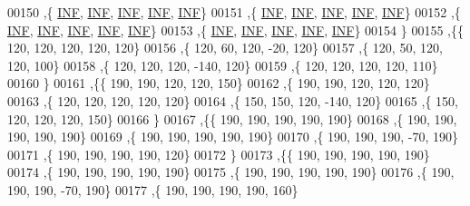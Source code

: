 \begin{DoxyCode}
00150   ,\{   \mbox{\hyperlink{1_88_84__epars_8h_a12c2040f25d8e3a7b9e1c2024c618cb6}{INF}},   \mbox{\hyperlink{1_88_84__epars_8h_a12c2040f25d8e3a7b9e1c2024c618cb6}{INF}},   \mbox{\hyperlink{1_88_84__epars_8h_a12c2040f25d8e3a7b9e1c2024c618cb6}{INF}},   \mbox{\hyperlink{1_88_84__epars_8h_a12c2040f25d8e3a7b9e1c2024c618cb6}{INF}},   \mbox{\hyperlink{1_88_84__epars_8h_a12c2040f25d8e3a7b9e1c2024c618cb6}{INF}}\}
00151   ,\{   \mbox{\hyperlink{1_88_84__epars_8h_a12c2040f25d8e3a7b9e1c2024c618cb6}{INF}},   \mbox{\hyperlink{1_88_84__epars_8h_a12c2040f25d8e3a7b9e1c2024c618cb6}{INF}},   \mbox{\hyperlink{1_88_84__epars_8h_a12c2040f25d8e3a7b9e1c2024c618cb6}{INF}},   \mbox{\hyperlink{1_88_84__epars_8h_a12c2040f25d8e3a7b9e1c2024c618cb6}{INF}},   \mbox{\hyperlink{1_88_84__epars_8h_a12c2040f25d8e3a7b9e1c2024c618cb6}{INF}}\}
00152   ,\{   \mbox{\hyperlink{1_88_84__epars_8h_a12c2040f25d8e3a7b9e1c2024c618cb6}{INF}},   \mbox{\hyperlink{1_88_84__epars_8h_a12c2040f25d8e3a7b9e1c2024c618cb6}{INF}},   \mbox{\hyperlink{1_88_84__epars_8h_a12c2040f25d8e3a7b9e1c2024c618cb6}{INF}},   \mbox{\hyperlink{1_88_84__epars_8h_a12c2040f25d8e3a7b9e1c2024c618cb6}{INF}},   \mbox{\hyperlink{1_88_84__epars_8h_a12c2040f25d8e3a7b9e1c2024c618cb6}{INF}}\}
00153   ,\{   \mbox{\hyperlink{1_88_84__epars_8h_a12c2040f25d8e3a7b9e1c2024c618cb6}{INF}},   \mbox{\hyperlink{1_88_84__epars_8h_a12c2040f25d8e3a7b9e1c2024c618cb6}{INF}},   \mbox{\hyperlink{1_88_84__epars_8h_a12c2040f25d8e3a7b9e1c2024c618cb6}{INF}},   \mbox{\hyperlink{1_88_84__epars_8h_a12c2040f25d8e3a7b9e1c2024c618cb6}{INF}},   \mbox{\hyperlink{1_88_84__epars_8h_a12c2040f25d8e3a7b9e1c2024c618cb6}{INF}}\}
00154   \}
00155  ,\{\{   120,   120,   120,   120,   120\}
00156   ,\{   120,    60,   120,   -20,   120\}
00157   ,\{   120,    50,   120,   120,   100\}
00158   ,\{   120,   120,   120,  -140,   120\}
00159   ,\{   120,   120,   120,   120,   110\}
00160   \}
00161  ,\{\{   190,   190,   120,   120,   150\}
00162   ,\{   190,   190,   120,   120,   120\}
00163   ,\{   120,   120,   120,   120,   120\}
00164   ,\{   150,   150,   120,  -140,   120\}
00165   ,\{   150,   120,   120,   120,   150\}
00166   \}
00167  ,\{\{   190,   190,   190,   190,   190\}
00168   ,\{   190,   190,   190,   190,   190\}
00169   ,\{   190,   190,   190,   190,   190\}
00170   ,\{   190,   190,   190,   -70,   190\}
00171   ,\{   190,   190,   190,   190,   120\}
00172   \}
00173  ,\{\{   190,   190,   190,   190,   190\}
00174   ,\{   190,   190,   190,   190,   190\}
00175   ,\{   190,   190,   190,   190,   190\}
00176   ,\{   190,   190,   190,   -70,   190\}
00177   ,\{   190,   190,   190,   190,   160\}

\end{DoxyCode}
